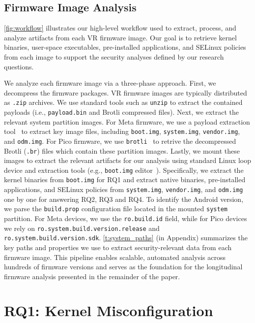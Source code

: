\documentclass[sigconf]{acmart}
\newcommand{\cc}[1]{\mbox{\smaller[0.5]\texttt{#1}}}
\begin{document}
\subsection{Firmware Image Analysis}

\autoref{fig:workflow} illustrates our high-level workflow used to extract, process, and analyze artifacts from each VR firmware image.
Our goal is to retrieve kernel binaries, user-space executables, pre-installed applications, and SELinux policies from each image to support the security analyses defined by our research questions.

We analyze each firmware image via a three-phase approach.
First, we decompress the firmware packages.
VR firmware images are typically distributed as \texttt{.zip} archives.
We use standard tools such as \cc{unzip}  to extract the contained payloads (i.e., \cc{payload.bin} and Brotli compressed files). 
Next, we extract the relevant system partition images.
For Meta firmware, we use a payload extraction tool~\cite{payload-dump} to extract key image files, including \cc{boot.img}, \cc{system.img}, \cc{vendor.img}, and \cc{odm.img}.
For Pico firmware, we use \cc{brotli}~\cite{Brotli} to retrive the decompressed Brotli (\cc{.br}) files which contain these partition images.
Lastly, we mount these images to extract the relevant artifacts for our analysis using standard Linux loop device and extraction tools (e.g., \cc{boot.img} editor~\cite{boot-extractor}).
Specifically, we extract the kernel binaries from \cc{boot.img} for RQ1 and extract native binaries, pre-installed applications, and SELinux policies from \cc{system.img}, \cc{vendor.img}, and \cc{odm.img} one by one for answering RQ2, RQ3 and RQ4.
To identify the Android version, we parse the \cc{build.prop} configuration file located in the mounted \cc{system} partition.
For Meta devices, we use the \cc{ro.build.id} field, while for Pico devices we rely on \cc{ro.system.build.version.release} and \cc{ro.system.build.version.sdk}.
\autoref{t:system_paths} (in Appendix) summarizes the key paths and properties we use to extract security-relevant data from each firmware image.
This pipeline enables scalable, automated analysis 
across hundreds of firmware versions and serves as the foundation for the longitudinal firmware analysis presented in the remainder of the paper.


\section{RQ1: Kernel Misconfiguration}
\label{s:rq1}
\end{document}
